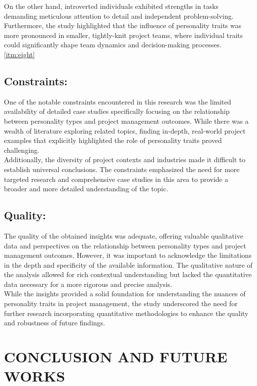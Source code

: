 \documentclass[a4Paper]{article}
\begin{document}
On the other hand, introverted individuals exhibited strengths in tasks demanding meticulous attention to detail and independent problem-solving. Furthermore, the study highlighted that the influence of personality traits was more pronounced in smaller, tightly-knit project teams, where individual traits could significantly shape team dynamics and decision-making processes. \ref{itm:eight}

\subsection{Constraints: }One of the notable constraints encountered in this research was the limited availability of detailed case studies specifically focusing on the relationship between personality types and project management outcomes. While there was a wealth of literature exploring related topics, finding in-depth, real-world project examples that explicitly highlighted the role of personality traits proved challenging.\\

Additionally, the diversity of project contexts and industries made it difficult to establish universal conclusions. The constraints emphasized the need for more targeted research and comprehensive case studies in this area to provide a broader and more detailed understanding of the topic. \\

\subsection{Quality: }The quality of the obtained insights was adequate, offering valuable qualitative data and perspectives on the relationship between personality types and project management outcomes. However, it was important to acknowledge the limitations in the depth and specificity of the available information. The qualitative nature of the analysis allowed for rich contextual understanding but lacked the quantitative data necessary for a more rigorous and precise analysis.\\

While the insights provided a solid foundation for understanding the nuances of personality traits in project management, the study underscored the need for further research incorporating quantitative methodologies to enhance the quality and robustness of future findings.

\pagebreak

\section{CONCLUSION AND FUTURE WORKS}
\end{document}

